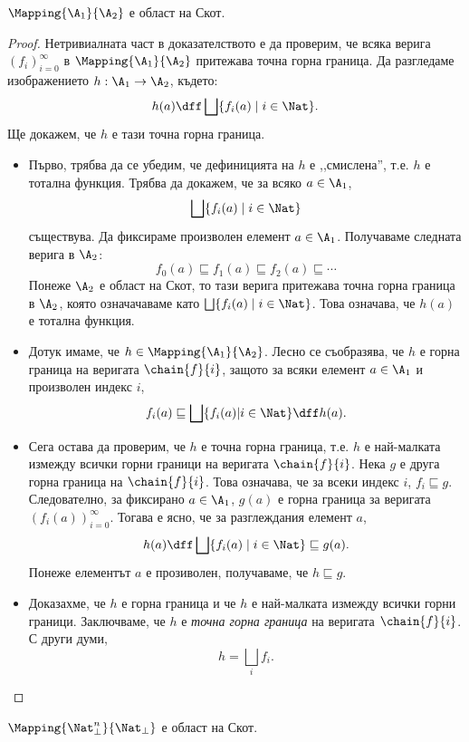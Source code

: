 \begin{framed}
  \begin{theorem}
    \label{th:all-mappings-is-domain}
    $\Mapping{\A_1}{\A_2}$ е област на Скот.
  \end{theorem}  
\end{framed}
\begin{proof}
  Нетривиалната част в доказателството е да проверим, че всяка верига $(f_i)^{\infty}_{i=0}$ в $\Mapping{\A_1}{\A_2}$
  притежава точна горна граница.
  Да разгледаме изображението $h:\A_1 \to \A_2$, където:
  \begin{equation}
    \label{eq:9}
    h(a) \dff \bigsqcup \{f_i(a) \mid i \in \Nat\}.
  \end{equation}
  Ще докажем, че $h$ е тази точна горна граница.
  \begin{itemize}
  \item
    Първо, трябва да се убедим, че дефиницията на $h$ е ,,смислена'', т.е. $h$ е тотална функция.
    Трябва да докажем, че за всяко $a\in \A_1$,
    \[\bigsqcup\{f_i(a) \mid i \in \Nat\}\] съществува.
    Да фиксираме произволен елемент $a \in \A_1$.
    Получаваме следната верига в $\A_2$:
    \[f_0(a) \sqsubseteq f_1(a) \sqsubseteq f_2(a) \sqsubseteq \cdots \]
    Понеже $\A_2$ е област на Скот, то тази верига притежава точна горна граница в $\A_2$,
    която означачаваме като $\bigsqcup\{f_i(a) \mid i \in \Nat\}$.
    Това означава, че $h(a)$ е тотална функция.
  \item
    Дотук имаме, че $h \in \Mapping{\A_1}{\A_2}$.
    Лесно се съобразява, че $h$ е горна граница на веригата $\chain{f}{i}$, защото за всяки елемент $a \in \A_1$
    и произволен индекс $i$,
    \[f_i(a) \sqsubseteq \bigsqcup\{f_i(a) | i \in \Nat\} \dff h(a).\]
  \item
    Сега остава да проверим, че $h$ е точна горна граница, т.е. $h$ е най-малката измежду всички горни граници на 
    веригата $\chain{f}{i}$.
    Нека $g$ е друга горна граница на $\chain{f}{i}$. Това означава, че за всеки индекс $i$,
    $f_i \sqsubseteq g$. Следователно, за фиксирано $a \in \A_1$,
    $g(a)$ е горна граница за веригата $(f_i(a))^{\infty}_{i=0}$.
    Тогава е ясно, че за разглеждания елемент $a$,
    \[h(a) \dff \bigsqcup\{f_i(a) \mid i\in\Nat\} \sqsubseteq g(a).\]
    Понеже елементът $a$ е прозиволен, получаваме, че $h \sqsubseteq g$.
  \item
    Доказахме, че $h$ е горна граница и че $h$ е най-малката измежду всички горни граници.
    Заключваме, че $h$ е {\em точна горна граница} на веригата $\chain{f}{i}$.
    С други думи,
    \[h = \bigsqcup_i f_i.\]
  \end{itemize}
\end{proof}

\begin{cor}
  $\Mapping{\Nat^n_\bot}{\Nat_\bot}$ е област на Скот.
\end{cor}


